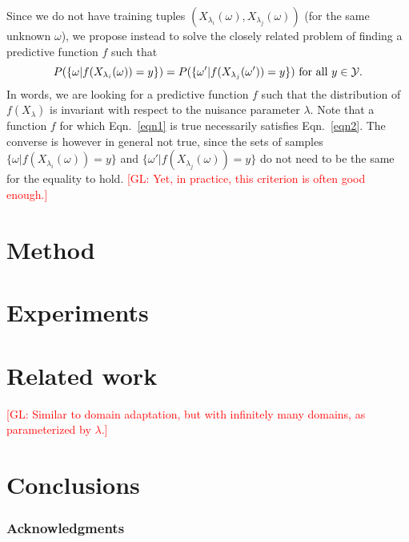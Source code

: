 \documentclass{article}
\newcommand{\glnote}[1]{\textcolor{red}{[GL: #1]}}
\theoremstyle{plain}
\begin{document}
Since we do not have training tuples $(X_{\lambda_i}(\omega),
X_{\lambda_j}(\omega))$ (for the same unknown $\omega$), we propose instead to
solve the closely related problem of finding a predictive function $f$ such that
\begin{equation}\label{eqn2}
    P(\{ \omega | f(X_{\lambda_i}(\omega)) = y \} ) = P( \{ \omega' | f(X_{\lambda_j}(\omega')) = y\}) \text{ for all $y \in {\cal Y}$}.
\end{equation}
In words, we are looking for a predictive function $f$ such that  the
distribution of $f(X_\lambda)$ is invariant with respect to the nuisance
parameter $\lambda$. Note that a function $f$ for which Eqn.~\ref{eqn1} is
true necessarily satisfies Eqn.~\ref{eqn2}. The converse is however in
general not true, since the sets of samples $\{ \omega | f(X_{\lambda_i}(\omega)) = y \}$
and $\{ \omega' | f(X_{\lambda_j}(\omega)) = y \}$ do not need to be the same
for the equality to hold. \glnote{Yet, in practice, this criterion is often good enough.}

\section{Method}
\label{sec:method}

\section{Experiments}

\section{Related work}

\glnote{Similar to domain adaptation, but with infinitely many domains,
as parameterized by $\lambda$.}

\section{Conclusions}

\subsubsection*{Acknowledgments}


{\small
}
\end{document}
